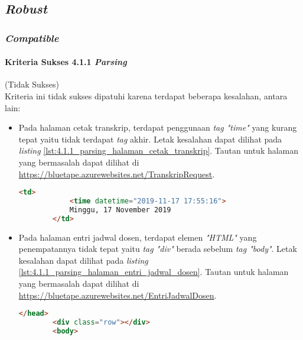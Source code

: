 \subsection{\textit{Robust}}
\label{subsec:kepatuhan_bluetape_robust}

\subsubsection{\textit{Compatible}}
\label{subsubsec:kepatuhan_bluetape_compatible}

\paragraph{Kriteria Sukses 4.1.1 \textit{Parsing}}
\label{par:kepatuhan_bluetape_kriteria_sukses_4.1.1}
(Tidak Sukses)\\

Kriteria ini tidak sukses dipatuhi karena terdapat beberapa kesalahan, antara lain:

\begin{itemize}
    \item Pada halaman cetak transkrip, terdapat penggunaan \textit{tag "time"} yang kurang tepat yaitu tidak terdapat \textit{tag} akhir. Letak kesalahan dapat dilihat pada \textit{listing} \ref{lst:4.1.1_parsing_halaman_cetak_transkrip}. Tautan untuk halaman yang bermasalah dapat dilihat di \url{https://bluetape.azurewebsites.net/TranskripRequest}.
    \begin{lstlisting}[frame=single, label={lst:4.1.1_parsing_halaman_cetak_transkrip}, language=HTML, caption=Pelanggaran Kriteria Sukses 4.1.1 pada Halaman Cetak Transkrip]
        <td>
            <time datetime="2019-11-17 17:55:16">
            Minggu, 17 November 2019
        </td>
    \end{lstlisting}

    \item Pada halaman entri jadwal dosen, terdapat elemen \textit{"HTML"} yang penempatannya tidak tepat yaitu \textit{tag "div"} berada sebelum \textit{tag "body"}. Letak kesalahan dapat dilihat pada \textit{listing} \ref{lst:4.1.1_parsing_halaman_entri_jadwal_dosen}. Tautan untuk halaman yang bermasalah dapat dilihat di \url{https://bluetape.azurewebsites.net/EntriJadwalDosen}.
    \begin{lstlisting}[frame=single, label={lst:4.1.1_parsing_halaman_entri_jadwal_dosen}, language=HTML, caption=Pelanggaran Kriteria Sukses 4.1.1 pada Halaman Entri Jadwal Dosen]
        </head>
        <div class="row"></div>        
        <body>
    \end{lstlisting}
\end{itemize}

